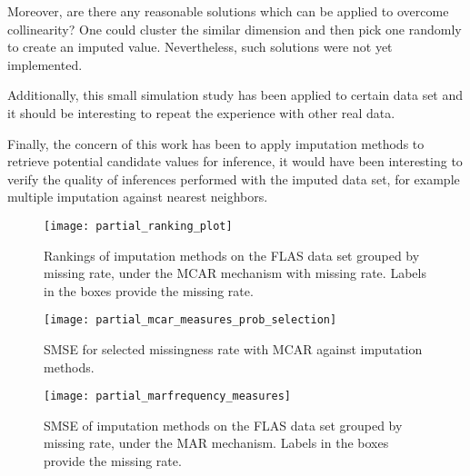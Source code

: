 Moreover, are there any reasonable solutions which can be applied to overcome
collinearity? One could cluster the similar dimension and then pick one randomly
to create an imputed value. Nevertheless, such solutions were not yet
implemented.

Additionally, this small simulation study has been applied to certain data set
and it should be interesting to repeat the experience with other real data.

Finally, the concern of this work has been to apply imputation methods to
retrieve potential candidate values for inference, it would have been
interesting to verify the quality of inferences performed with the imputed data
set, for example multiple imputation against nearest neighbors.


\begin{figure}
  \centering
  \texttt{[image: partial\_ranking\_plot]}
  \caption{Rankings of imputation methods on the FLAS data set grouped by
    missing rate, under the MCAR mechanism with missing rate. Labels in the
    boxes provide the missing rate.}
  \label{fig:ranking:imputations}
\end{figure}


\begin{figure}
  \centering
  \texttt{[image: partial\_mcar\_measures\_prob\_selection]}
  \caption{SMSE for selected missingness rate with MCAR
    against imputation methods.}
  \label{fig:mse:mcar}
\end{figure}


\begin{figure}
  \centering
  \texttt{[image: partial\_marfrequency\_measures]}
  \caption{SMSE of imputation methods on the FLAS data set grouped by missing
    rate, under the MAR mechanism. Labels in the boxes provide the missing
    rate.}
  \label{fig:mse:mar}
\end{figure}



